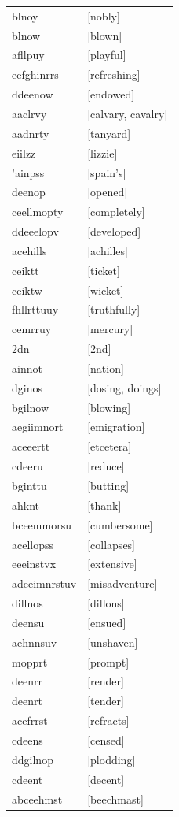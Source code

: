 \documentclass{article}
\begin{document}
\begin{tabular}{ll}
blnoy & [nobly] \\
blnow & [blown] \\
afllpuy & [playful] \\
eefghinrrs & [refreshing] \\
ddeenow & [endowed] \\
aaclrvy & [calvary, cavalry] \\
aadnrty & [tanyard] \\
eiilzz & [lizzie] \\
'ainpss & [spain's] \\
deenop & [opened] \\
ceellmopty & [completely] \\
ddeeelopv & [developed] \\
acehills & [achilles] \\
ceiktt & [ticket] \\
ceiktw & [wicket] \\
fhllrttuuy & [truthfully] \\
cemrruy & [mercury] \\
2dn & [2nd] \\
ainnot & [nation] \\
dginos & [dosing, doings] \\
bgilnow & [blowing] \\
aegiimnort & [emigration] \\
aceeertt & [etcetera] \\
cdeeru & [reduce] \\
bginttu & [butting] \\
ahknt & [thank] \\
bceemmorsu & [cumbersome] \\
acellopss & [collapses] \\
eeeinstvx & [extensive] \\
adeeimnrstuv & [misadventure] \\
dillnos & [dillons] \\
deensu & [ensued] \\
aehnnsuv & [unshaven] \\
mopprt & [prompt] \\
deenrr & [render] \\
deenrt & [tender] \\
acefrrst & [refracts] \\
cdeens & [censed] \\
ddgilnop & [plodding] \\
cdeent & [decent] \\
abceehmst & [beechmast] \\

\end{tabular}
\end{document}
